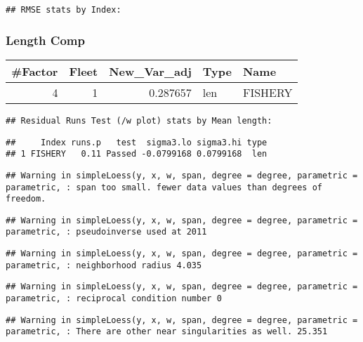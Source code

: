 \documentclass[
]{article}
\begin{document}
\begin{verbatim}
## RMSE stats by Index:
\end{verbatim}

\hypertarget{length-comp}{%
\subsubsection{Length Comp}\label{length-comp}}

\captionsetup[table]{labelformat=empty,skip=1pt}
\begin{longtable}{rrrll}
\toprule
\#Factor & Fleet & New\_Var\_adj & Type & Name \\ 
\midrule
4 & 1 & 0.287657 & len & FISHERY \\ 
\bottomrule
\end{longtable}

\begin{verbatim}
## Residual Runs Test (/w plot) stats by Mean length:
\end{verbatim}

\begin{verbatim}
##     Index runs.p   test  sigma3.lo sigma3.hi type
## 1 FISHERY   0.11 Passed -0.0799168 0.0799168  len
\end{verbatim}

\begin{verbatim}
## Warning in simpleLoess(y, x, w, span, degree = degree, parametric = parametric, : span too small. fewer data values than degrees of freedom.
\end{verbatim}

\begin{verbatim}
## Warning in simpleLoess(y, x, w, span, degree = degree, parametric = parametric, : pseudoinverse used at 2011
\end{verbatim}

\begin{verbatim}
## Warning in simpleLoess(y, x, w, span, degree = degree, parametric = parametric, : neighborhood radius 4.035
\end{verbatim}

\begin{verbatim}
## Warning in simpleLoess(y, x, w, span, degree = degree, parametric = parametric, : reciprocal condition number 0
\end{verbatim}

\begin{verbatim}
## Warning in simpleLoess(y, x, w, span, degree = degree, parametric = parametric, : There are other near singularities as well. 25.351
\end{verbatim}
\end{document}
